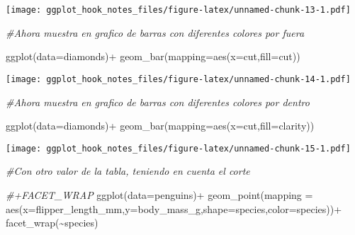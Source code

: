 \documentclass[
]{article}
\newenvironment{Shaded}{\begin{snugshade}}{\end{snugshade}}
\newcommand{\AttributeTok}[1]{\textcolor[rgb]{0.77,0.63,0.00}{#1}}
\newcommand{\CommentTok}[1]{\textcolor[rgb]{0.56,0.35,0.01}{\textit{#1}}}
\newcommand{\FunctionTok}[1]{\textcolor[rgb]{0.00,0.00,0.00}{#1}}
\newcommand{\NormalTok}[1]{#1}
\newcommand{\SpecialCharTok}[1]{\textcolor[rgb]{0.00,0.00,0.00}{#1}}
\begin{document}
\texttt{[image: ggplot\_hook\_notes\_files/figure-latex/unnamed-chunk-13-1.pdf]}

\begin{Shaded}
\begin{Highlighting}[]
\CommentTok{\#Ahora muestra en grafico de barras con diferentes colores por fuera}
\end{Highlighting}
\end{Shaded}

\begin{Shaded}
\begin{Highlighting}[]
\FunctionTok{ggplot}\NormalTok{(}\AttributeTok{data=}\NormalTok{diamonds)}\SpecialCharTok{+}
  \FunctionTok{geom\_bar}\NormalTok{(}\AttributeTok{mapping=}\FunctionTok{aes}\NormalTok{(}\AttributeTok{x=}\NormalTok{cut,}\AttributeTok{fill=}\NormalTok{cut))}
\end{Highlighting}
\end{Shaded}

\texttt{[image: ggplot\_hook\_notes\_files/figure-latex/unnamed-chunk-14-1.pdf]}

\begin{Shaded}
\begin{Highlighting}[]
\CommentTok{\#Ahora muestra en grafico de barras con diferentes colores por dentro}
\end{Highlighting}
\end{Shaded}

\begin{Shaded}
\begin{Highlighting}[]
\FunctionTok{ggplot}\NormalTok{(}\AttributeTok{data=}\NormalTok{diamonds)}\SpecialCharTok{+}
  \FunctionTok{geom\_bar}\NormalTok{(}\AttributeTok{mapping=}\FunctionTok{aes}\NormalTok{(}\AttributeTok{x=}\NormalTok{cut,}\AttributeTok{fill=}\NormalTok{clarity))}
\end{Highlighting}
\end{Shaded}

\texttt{[image: ggplot\_hook\_notes\_files/figure-latex/unnamed-chunk-15-1.pdf]}

\begin{Shaded}
\begin{Highlighting}[]
\CommentTok{\#Con otro valor de la tabla, teniendo en cuenta el corte}
\end{Highlighting}
\end{Shaded}

\begin{Shaded}
\begin{Highlighting}[]
\CommentTok{\#+FACET\_WRAP}
\FunctionTok{ggplot}\NormalTok{(}\AttributeTok{data=}\NormalTok{penguins)}\SpecialCharTok{+}
  \FunctionTok{geom\_point}\NormalTok{(}\AttributeTok{mapping =} \FunctionTok{aes}\NormalTok{(}\AttributeTok{x=}\NormalTok{flipper\_length\_mm,}\AttributeTok{y=}\NormalTok{body\_mass\_g,}\AttributeTok{shape=}\NormalTok{species,}\AttributeTok{color=}\NormalTok{species))}\SpecialCharTok{+}
  \FunctionTok{facet\_wrap}\NormalTok{(}\SpecialCharTok{\textasciitilde{}}\NormalTok{species)}
\end{Highlighting}
\end{Shaded}
\end{document}
